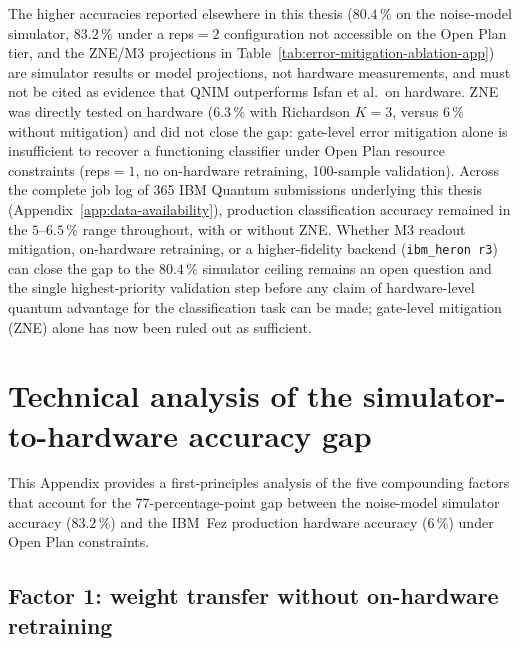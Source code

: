 \documentclass[11pt,a4paper, english]{book}
\theoremstyle{plain}
\theoremstyle{definition}
\numberwithin{equation}{chapter}
\numberwithin{figure}{chapter}
\numberwithin{table}{chapter}
\begin{document}
The higher accuracies reported elsewhere in this thesis ($80.4\,\%$ on the
noise-model simulator, $83.2\,\%$ under a reps$=2$ configuration not
accessible on the Open Plan tier, and the ZNE/M3 projections in
Table~\ref{tab:error-mitigation-ablation-app}) are simulator results or
model projections, not hardware measurements, and must not be cited as
evidence that QNIM outperforms Isfan et al.\ on hardware. ZNE was directly tested on hardware ($6.3\,\%$ with Richardson
$K=3$, versus $6\,\%$ without mitigation) and did not close the gap: gate-level
error mitigation alone is insufficient to recover a functioning classifier
under Open Plan resource constraints (reps$=1$, no on-hardware retraining,
100-sample validation). Across the complete job log of 365 IBM Quantum
submissions underlying this thesis (Appendix~\ref{app:data-availability}),
production classification accuracy remained in the $5$--$6.5\,\%$ range
throughout, with or without ZNE. Whether M3 readout mitigation,
on-hardware retraining, or a higher-fidelity backend (\texttt{ibm\_heron~r3})
can close the gap to the $80.4\,\%$ simulator ceiling remains an open
question and the single highest-priority validation step before any claim
of hardware-level quantum advantage for the classification task can be made;
gate-level mitigation (ZNE) alone has now been ruled out as sufficient.


\chapter{Technical analysis of the simulator-to-hardware accuracy gap}
\label{app:sim-hw-gap}

This Appendix provides a first-principles analysis of the five compounding
factors that account for the $77$-percentage-point gap between the 
noise-model simulator accuracy ($83.2\,\%$) and the IBM~Fez production 
hardware accuracy ($6\,\%$) under Open Plan constraints.

\section{Factor 1: weight transfer without on-hardware retraining}
\label{app:gap-weight-transfer}
\end{document}

